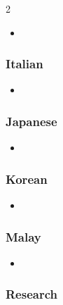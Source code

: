 \begin{multicols}{2}
\begin{itemize}

 \item \autocite{mai:wahanakomputer2013appinventorbyexample}

\end{itemize}

\subsubsection{Italian}

\begin{itemize}

 \item \autocite{mai:taccetti2013usareappinventor}

\end{itemize}

\subsubsection{Japanese}

\begin{itemize}

 \item \autocite{mai:tsukada2011appinventorjapanese}

\end{itemize}

\subsubsection{Korean}

\begin{itemize}

 \item \autocite{mai:sunny2022aiappprojects}

\end{itemize}

\subsubsection{Malay}

\begin{itemize}

 \item \autocite{mai:abdhalim2019jombinaappinventor}

\end{itemize}

\subsubsection{Research}


\end{multicols}
